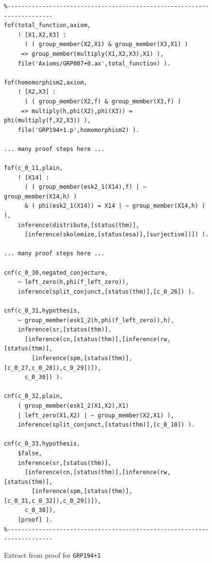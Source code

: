 \documentclass[runningheads]{llncs}
\begin{document}
\begin{figure}[h!]
\centering
{\footnotesize
{\setlength{\baselineskip}{3mm}
\begin{verbatim}
%------------------------------------------------------------------------
fof(total_function,axiom,
    ! [X1,X2,X3] :
      ( ( group_member(X2,X1) & group_member(X3,X1) )
     => group_member(multiply(X1,X2,X3),X1) ),
    file('Axioms/GRP007+0.ax',total_function) ).

fof(homomorphism2,axiom,
    ! [X2,X3] :
      ( ( group_member(X2,f) & group_member(X3,f) )
     => multiply(h,phi(X2),phi(X3)) = phi(multiply(f,X2,X3)) ),
    file('GRP194+1.p',homomorphism2) ).

... many proof steps here ...

fof(c_0_11,plain,
    ! [X14] :
      ( ( group_member(esk2_1(X14),f) | ~ group_member(X14,h) )
      & ( phi(esk2_1(X14)) = X14 | ~ group_member(X14,h) ) ),
    inference(distribute,[status(thm)],
      [inference(skolemize,[status(esa)],[surjective])]) ).

... many proof steps here ...

cnf(c_0_30,negated_conjecture,
    ~ left_zero(h,phi(f_left_zero)),
    inference(split_conjunct,[status(thm)],[c_0_26]) ).

cnf(c_0_31,hypothesis,
    ~ group_member(esk1_2(h,phi(f_left_zero)),h),
    inference(sr,[status(thm)],
      [inference(cn,[status(thm)],[inference(rw,[status(thm)],
        [inference(spm,[status(thm)],[c_0_27,c_0_28]),c_0_29])]),
      c_0_30]) ).

cnf(c_0_32,plain,
    ( group_member(esk1_2(X1,X2),X1)
    | left_zero(X1,X2) | ~ group_member(X2,X1) ),
    inference(split_conjunct,[status(thm)],[c_0_10]) ).

cnf(c_0_33,hypothesis,
    $false,
    inference(sr,[status(thm)],
      [inference(cn,[status(thm)],[inference(rw,[status(thm)],
        [inference(spm,[status(thm)],[c_0_31,c_0_32]),c_0_29])]),
      c_0_30]),
    [proof] ).
%------------------------------------------------------------------------
\end{verbatim}
}}
\caption{Extract from proof for {\tt GRP194+1}}
\label{ExampleDerivationFormulae}
\end{figure}
\end{document}
